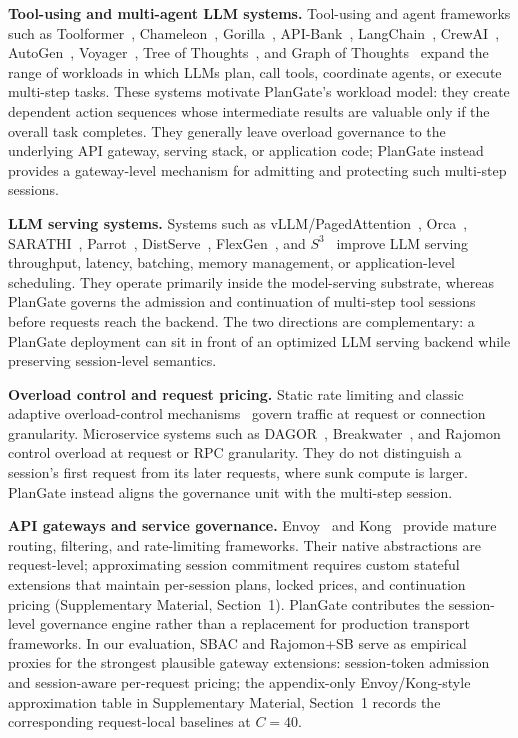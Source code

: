 \documentclass[sigconf,review,anonymous]{acmart}
\begin{document}
\textbf{Tool-using and multi-agent LLM systems.} Tool-using and agent frameworks such as Toolformer~\cite{toolformer}, Chameleon~\cite{chameleon}, Gorilla~\cite{gorilla}, API-Bank~\cite{apibank}, LangChain~\cite{langchain}, CrewAI~\cite{crewai}, AutoGen~\cite{autogen}, Voyager~\cite{voyager}, Tree of Thoughts~\cite{tot}, and Graph of Thoughts~\cite{got} expand the range of workloads in which LLMs plan, call tools, coordinate agents, or execute multi-step tasks. These systems motivate PlanGate's workload model: they create dependent action sequences whose intermediate results are valuable only if the overall task completes. They generally leave overload governance to the underlying API gateway, serving stack, or application code; PlanGate instead provides a gateway-level mechanism for admitting and protecting such multi-step sessions.

\textbf{LLM serving systems.} Systems such as vLLM/PagedAttention~\cite{vllm}, Orca~\cite{orca}, SARATHI~\cite{sarathi}, Parrot~\cite{parrot}, DistServe~\cite{distserve}, FlexGen~\cite{flexgen}, and $S^3$~\cite{s3} improve LLM serving throughput, latency, batching, memory management, or application-level scheduling. They operate primarily inside the model-serving substrate, whereas PlanGate governs the admission and continuation of multi-step tool sessions before requests reach the backend. The two directions are complementary: a PlanGate deployment can sit in front of an optimized LLM serving backend while preserving session-level semantics.

\textbf{Overload control and request pricing.} Static rate limiting and classic adaptive overload-control mechanisms~\cite{leaky_bucket,overload_survey} govern traffic at request or connection granularity. Microservice systems such as DAGOR~\cite{dagor}, Breakwater~\cite{breakwater}, and Rajomon~\cite{rajomon2025} control overload at request or RPC granularity. They do not distinguish a session's first request from its later requests, where sunk compute is larger. PlanGate instead aligns the governance unit with the multi-step session.

\textbf{API gateways and service governance.} Envoy~\cite{envoy} and Kong~\cite{kong} provide mature routing, filtering, and rate-limiting frameworks. Their native abstractions are request-level; approximating session commitment requires custom stateful extensions that maintain per-session plans, locked prices, and continuation pricing (Supplementary Material, Section~1). PlanGate contributes the session-level governance engine rather than a replacement for production transport frameworks. In our evaluation, SBAC and Rajomon+SB serve as empirical proxies for the strongest plausible gateway extensions: session-token admission and session-aware per-request pricing; the appendix-only Envoy/Kong-style approximation table in Supplementary Material, Section~1 records the corresponding request-local baselines at $C{=}40$.
\end{document}
